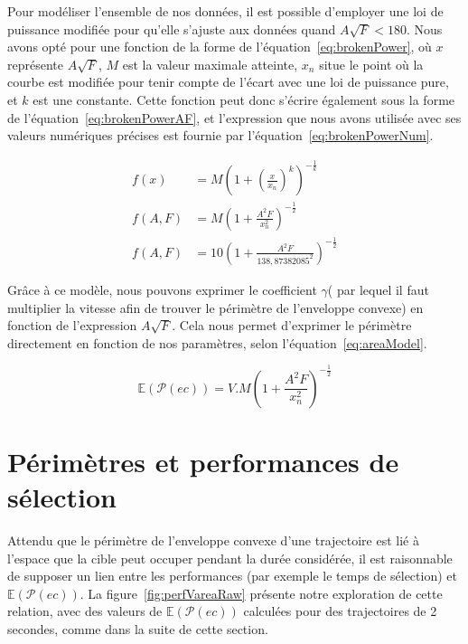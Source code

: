 	Pour modéliser l'ensemble de nos données, il est possible d'employer une loi de puissance modifiée pour qu'elle s'ajuste aux données quand $A\sqrt{F}<180$. Nous avons opté pour une fonction de la forme de l'équation~\ref{eq:brokenPower}, où $x$ représente $A\sqrt{F}$, $M$ est la valeur maximale atteinte, $x_{n}$ situe le point où la courbe est modifiée pour tenir compte de l'écart avec une loi de puissance pure, et $k$ est une constante. Cette fonction peut donc s'écrire également sous la forme de l'équation~\ref{eq:brokenPowerAF}, et l'expression que nous avons utilisée avec ses valeurs numériques précises est fournie par l'équation~\ref{eq:brokenPowerNum}.
	
	\begin{align}
		\label{eq:brokenPower}
		f(x) &= M \left( 1 + \left( \frac{x}{x_{n}} \right)^{k} \right)^{-\frac{1}{k}} \\
		\label{eq:brokenPowerAF}
		f(A,F) &= M \left( 1 + \frac{A^{2}F}{x_{n}^{2}}\right)^{-\frac{1}{2}} \\
		\label{eq:brokenPowerNum}
		f(A,F) &= 10 \left( 1 + \frac{A^{2}F}{138,87382085^{2}} \right)^{-\frac{1}{2}}
	\end{align}
	
	Grâce à ce modèle, nous pouvons exprimer le coefficient $\gamma$( par lequel il faut multiplier la vitesse afin de trouver le périmètre de l'enveloppe convexe) en fonction de l'expression $A\sqrt{F}$. Cela nous permet d'exprimer le périmètre directement en fonction de nos paramètres, selon l'équation~\ref{eq:areaModel}.
	
	\begin{equation}
		\mathbb{E}(\mathcal{P}(ec)) = V.M \left( 1 + \frac{A^{2}F}{x_{n}^{2}}\right)^{-\frac{1}{2}}
		\label{eq:perimModel}
	\end{equation}
	
	
\section{Périmètres et performances de sélection}
	Attendu que le périmètre de l'enveloppe convexe d'une trajectoire est lié à l'espace que la cible peut occuper pendant la durée considérée, il est raisonnable de supposer un lien entre les performances (par exemple le temps de sélection) et $\mathbb{E}(\mathcal{P}(ec))$. La figure~\ref{fig:perfVareaRaw} présente notre exploration de cette relation, avec des valeurs de $\mathbb{E}(\mathcal{P}(ec))$ calculées pour des trajectoires de 2 secondes, comme dans la suite de cette section.

